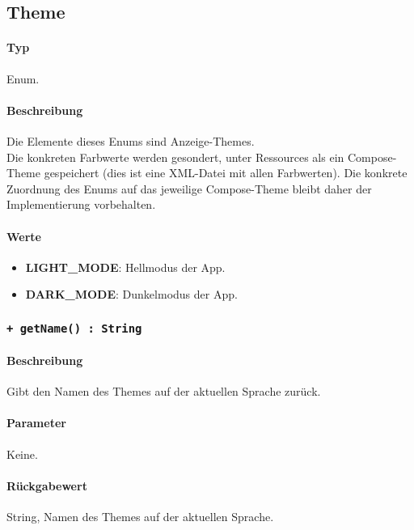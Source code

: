 \subsection{Theme}
\paragraph*{Typ}
Enum.
\paragraph*{Beschreibung}
Die Elemente dieses Enums sind Anzeige-Themes.\\
Die konkreten Farbwerte werden gesondert, unter Ressources als ein Compose-Theme gespeichert 
(dies ist eine XML-Datei mit allen Farbwerten). Die konkrete Zuordnung des Enums auf das jeweilige 
Compose-Theme bleibt daher der Implementierung vorbehalten.

\paragraph*{Werte}
\begin{itemize}
    \item \textbf{LIGHT\_MODE}: Hellmodus der App.
    \item \textbf{DARK\_MODE}: Dunkelmodus der App.
\end{itemize}

\subsubsection{\texttt{+ getName() : String}}%
\paragraph*{Beschreibung}
Gibt den Namen des Themes auf der aktuellen Sprache zurück.
\paragraph*{Parameter}
Keine.
\paragraph*{Rückgabewert}
String,  Namen des Themes auf der aktuellen Sprache.